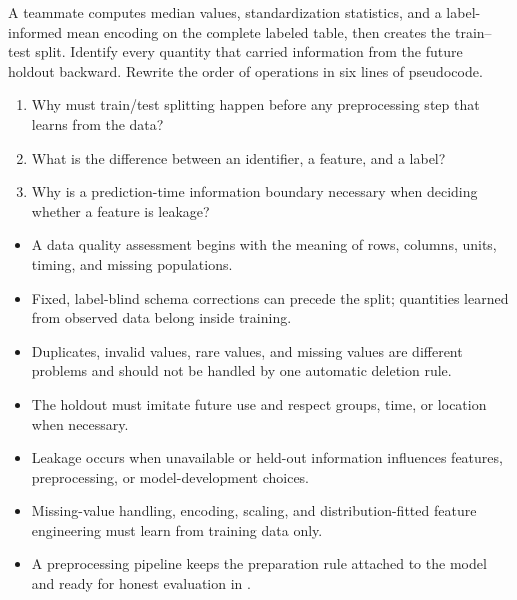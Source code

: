 \begin{debugtask}
A teammate computes median values, standardization statistics, and a label-informed mean encoding on the complete labeled table, then creates the train--test split. Identify every quantity that carried information from the future holdout backward. Rewrite the order of operations in six lines of pseudocode.
\end{debugtask}




\begin{quickcheck}
\begin{enumerate}
  \item Why must train/test splitting happen before any preprocessing step that learns from the data?
  \item What is the difference between an identifier, a feature, and a label?
  \item Why is a prediction-time information boundary necessary when deciding whether a feature is leakage?
\end{enumerate}
\end{quickcheck}

\begin{chapterrecap}
\begin{itemize}
  \item A data quality assessment begins with the meaning of rows, columns, units, timing, and missing populations.
  \item Fixed, label-blind schema corrections can precede the split; quantities learned from observed data belong inside training.
  \item Duplicates, invalid values, rare values, and missing values are different problems and should not be handled by one automatic deletion rule.
  \item The holdout must imitate future use and respect groups, time, or location when necessary.
  \item Leakage occurs when unavailable or held-out information influences features, preprocessing, or model-development choices.
  \item Missing-value handling, encoding, scaling, and distribution-fitted feature engineering must learn from training data only.
  \item A preprocessing pipeline keeps the preparation rule attached to the model and ready for honest evaluation in .
\end{itemize}
\end{chapterrecap}
